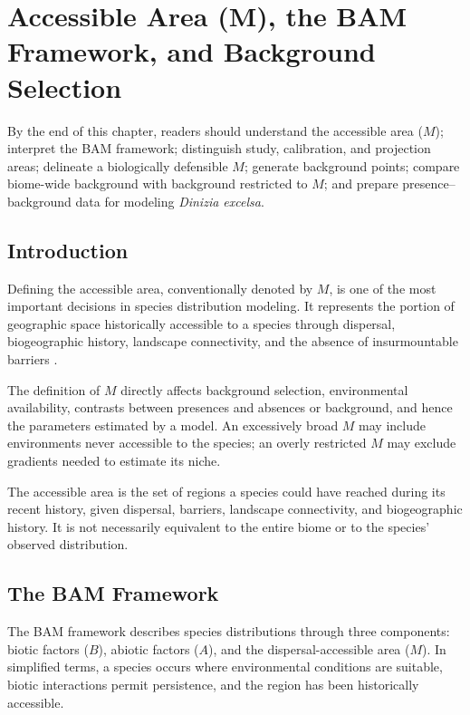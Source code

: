 \chapter[Accessible Area M]{Accessible Area (M), the BAM Framework, and Background Selection}

\begin{objetivos}
By the end of this chapter, readers should understand the accessible area
($M$); interpret the BAM framework; distinguish study, calibration, and
projection areas; delineate a biologically defensible $M$; generate background
points; compare biome-wide background with background restricted to $M$; and
prepare presence--background data for modeling \textit{Dinizia excelsa}.
\end{objetivos}

\section{Introduction}

Defining the accessible area, conventionally denoted by $M$, is one of the most
important decisions in species distribution modeling. It represents the portion
of geographic space historically accessible to a species through dispersal,
biogeographic history, landscape connectivity, and the absence of insurmountable
barriers \parencite{soberon2005,soberon2007,soberon2009,barve2011crucial}.

The definition of $M$ directly affects background selection, environmental
availability, contrasts between presences and absences or background, and hence
the parameters estimated by a model. An excessively broad $M$ may include
environments never accessible to the species; an overly restricted $M$ may
exclude gradients needed to estimate its niche.

\begin{conceito}[title={\faBook\quad Accessible area ($M$)}]
The accessible area is the set of regions a species could have reached during
its recent history, given dispersal, barriers, landscape connectivity, and
biogeographic history. It is not necessarily equivalent to the entire biome or
to the species' observed distribution.
\end{conceito}

\section{The BAM Framework}

The BAM framework describes species distributions through three components:
biotic factors ($B$), abiotic factors ($A$), and the dispersal-accessible area
($M$). In simplified terms, a species occurs where environmental conditions are
suitable, biotic interactions permit persistence, and the region has been
historically accessible.

